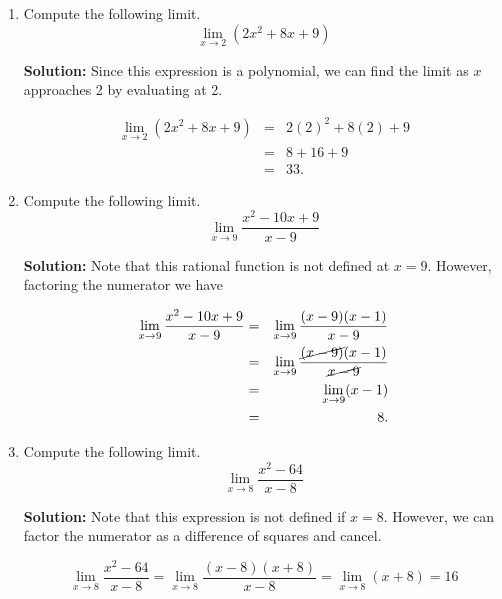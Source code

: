 \documentclass{article}
\begin{document}
\ActivityTitle[class=Calculus I, number=1, name=Limits (Solutions)]

\begin{enumerate}
\item Compute the following limit. \[ \lim_{x \rightarrow 2} \left( 2 x^2 + 8 x + 9 \right) \]

\textbf{Solution:} Since this expression is a polynomial, we can find the limit as $x$ approaches 2 by evaluating at 2.

\begin{eqnarray*}
\lim_{x \rightarrow 2} \left( 2 x^2 + 8 x + 9 \right)
 & = & 2 (2)^2 + 8 (2) + 9 \\
 & = & 8 + 16 + 9 \\
 & = & 33.
\end{eqnarray*}


  
\vspace{1cm}

\item Compute the following limit. \[ \displaystyle\lim_{x \rightarrow 9} \frac{x^2 - 10x + 9}{x - 9} \]

\textbf{Solution:} Note that this rational function is not defined at $x = 9$. However, factoring the numerator we have 

\begin{eqnarray*}
\lim_{x \rightarrow 9} \frac{x^2 - 10x + 9}{x - 9}
 & = & \lim_{x \rightarrow 9} \frac{(x - 9)(x - 1)}{x - 9} \\
 & = & \lim_{x \rightarrow 9} \frac{\cancel{(x - 9)}(x - 1)}{\cancel{x - 9}} \\
 & = & \lim_{x \rightarrow 9} (x - 1) \\
 & = & 8. \\
\end{eqnarray*}


  
\vspace{1cm}

\item Compute the following limit. \[ \lim_{x \rightarrow 8} \frac{x^2 - 64}{x - 8} \]

\textbf{Solution:} Note that this expression is not defined if $x = 8$. However, we can factor the numerator as a difference of squares and cancel.

\[ \lim_{x \rightarrow 8} \frac{x^2 - 64}{x - 8} = \lim_{x \rightarrow 8} \frac{(x - 8)(x + 8)}{x - 8} = \lim_{x \rightarrow 8} (x + 8) = 16 \]



\end{enumerate}
\end{document}

